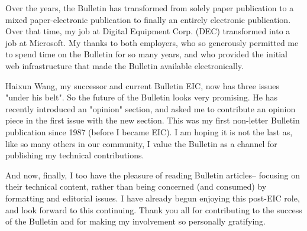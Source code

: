 \documentclass[11pt]{article}
\begin{document}
Over the years, the Bulletin has transformed from solely paper publication to a mixed paper-electronic publication to finally an entirely electronic publication.  Over that time, my job at Digital Equipment Corp. (DEC) transformed into a job at Microsoft.  My thanks to both employers, who so generously permitted me to spend time on the Bulletin for so many years, and who provided the initial web infrastructure that made the Bulletin available electronically.

Haixun Wang, my successor and current Bulletin EIC, now has three issues "under his belt".  So the future of the Bulletin looks very promising.  He has recently introduced an "opinion" section, and asked me to contribute an opinion piece in the first issue with the new section.  This was my first non-letter Bulletin publication since 1987 (before I became EIC).  I am hoping it is not the last as, like so many others in our community, I value the Bulletin as a channel for publishing my technical contributions.
 
And now, finally, I too have the pleasure of reading Bulletin articles-- focusing on their technical content, rather than being concerned (and consumed) by formatting and editorial issues.  I have already begun enjoying this post-EIC role, and look forward to this continuing.  Thank you all for contributing to the success of the Bulletin and for making my involvement so personally gratifying.
\end{document}
